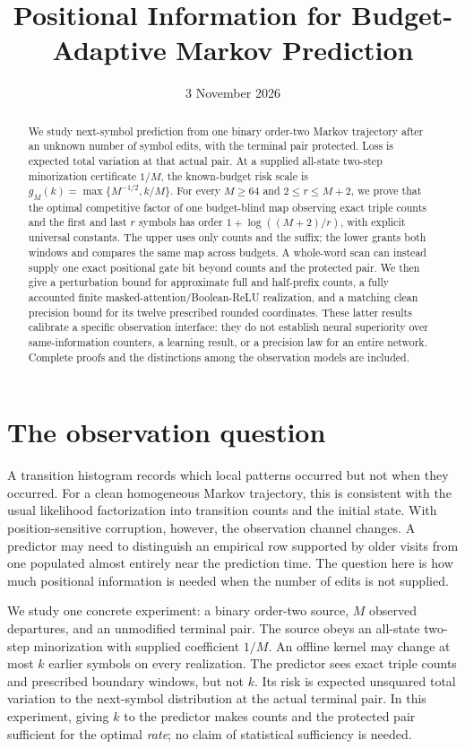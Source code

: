 \documentclass[11pt,letterpaper]{article}
\title{Positional Information for Budget-Adaptive Markov Prediction}
\author{}
\date{3 November 2026}
\theoremstyle{definition}
\theoremstyle{remark}
\numberwithin{equation}{section}
\begin{document}
\maketitle
\begin{abstract}
We study next-symbol prediction from one binary order-two Markov trajectory after an unknown number of symbol edits, with the terminal pair protected. Loss is expected total variation at that actual pair. At a supplied all-state two-step minorization certificate $1/M$, the known-budget risk scale is $g_M(k)=\max\{M^{-1/2},k/M\}$. For every $M\ge64$ and $2\le r\le M+2$, we prove that the optimal competitive factor of one budget-blind map observing exact triple counts and the first and last $r$ symbols has order $1+\log((M+2)/r)$, with explicit universal constants. The upper uses only counts and the suffix; the lower grants both windows and compares the same map across budgets. A whole-word scan can instead supply one exact positional gate bit beyond counts and the protected pair. We then give a perturbation bound for approximate full and half-prefix counts, a fully accounted finite masked-attention/Boolean-ReLU realization, and a matching clean precision bound for its twelve prescribed rounded coordinates. These latter results calibrate a specific observation interface: they do not establish neural superiority over same-information counters, a learning result, or a precision law for an entire network. Complete proofs and the distinctions among the observation models are included.
\end{abstract}

\section{The observation question}
A transition histogram records which local patterns occurred but not when they occurred. For a clean homogeneous Markov trajectory, this is consistent with the usual likelihood factorization into transition counts and the initial state. With position-sensitive corruption, however, the observation channel changes. A predictor may need to distinguish an empirical row supported by older visits from one populated almost entirely near the prediction time. The question here is how much positional information is needed when the number of edits is not supplied.

We study one concrete experiment: a binary order-two source, $M$ observed departures, and an unmodified terminal pair. The source obeys an all-state two-step minorization with supplied coefficient $1/M$. An offline kernel may change at most $k$ earlier symbols on every realization. The predictor sees exact triple counts and prescribed boundary windows, but not $k$. Its risk is expected unsquared total variation to the next-symbol distribution at the actual terminal pair. In this experiment, giving $k$ to the predictor makes counts and the protected pair sufficient for the optimal \emph{rate}; no claim of statistical sufficiency is needed.
\end{document}
